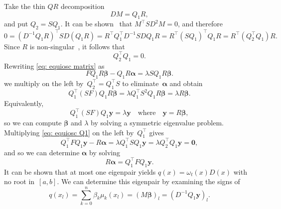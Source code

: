 \documentclass[12pt,a4paper]{article}
\begin{document}
Take the thin $QR$ decomposition
\[
DM=Q_1R,
\]
and put $Q_2=SQ_1$.  It can be shown~\cite[Lemma~4.3]{FilipEtAl2018} that
$M^\top SD^2M=0$, and therefore
\[
0=(D^{-1}Q_1R)^\top SD(Q_1R)=R^\top Q_1^\top D^{-1}SDQ_1R
=R^\top(SQ_1)^\top Q_1R=R^\top(Q_2^\top Q_1)R.
\]
Since $R$ is non-singular~\cite[Theorem~4.4]{FilipEtAl2018}, it follows that 
\[
Q_2^\top Q_1=0.
\]
Rewriting \eqref{eq: equiosc matrix} as
\begin{equation}\label{eq: equiosc Q1}
FQ_1R\boldsymbol{\beta}-Q_1R\boldsymbol{\alpha}
    =\lambda SQ_1R\boldsymbol{\beta}.
\end{equation}
we multiply on the left by~$Q_2^\top=Q_1^\top S$ to 
eliminate~$\boldsymbol{\alpha}$ and obtain
\[
Q_1^\top(SF)Q_1R\boldsymbol{\beta}=\lambda Q_1^\top S^2Q_1R\boldsymbol{\beta}
    =\lambda R\boldsymbol{\beta}.
\]
Equivalently,
\[
Q_1^\top(SF)Q_1\boldsymbol{y}=\lambda\boldsymbol{y}
\quad\text{where}\quad\boldsymbol{y}=R\boldsymbol{\beta},
\]
so we can compute $\boldsymbol{\beta}$ and $\lambda$ by solving a symmetric 
eigenvalue problem.  Multiplying \eqref{eq: equiosc Q1} on the left 
by~$Q_1^\top$ gives
\[
Q_1^\top FQ_1\boldsymbol{y}-R\boldsymbol{\alpha}
    =\lambda Q_1^\top SQ_1\boldsymbol{y}
    =\lambda Q_2^\top Q_1\boldsymbol{y}=\boldsymbol{0},
\]
and so we can determine $\boldsymbol{\alpha}$ by solving
\[
R\boldsymbol{\alpha}=Q_1^\top FQ_1\boldsymbol{y}.
\]
It can be shown that at most one eigenpair yields $q(x)=\omega_t(x)D(x)$ with 
no root in~$[a,b]$.  We can determine this eigenpair by examining the signs of
\[
q(x_l)=\sum_{k=0}^n\beta_k\mu_k(x_l)=(M\boldsymbol{\beta})_l
    =(D^{-1}Q_1\boldsymbol{y})_l.
\]



\printbibliography
\end{document}
